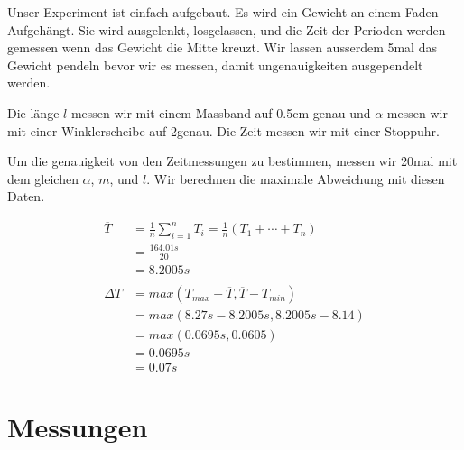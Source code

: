 \documentclass[12pt, a4paper, twoside]{article}
\begin{document}
Unser Experiment ist einfach aufgebaut.
Es wird ein Gewicht an einem Faden Aufgehängt.
Sie wird ausgelenkt, losgelassen, und die Zeit der Perioden werden gemessen wenn das Gewicht die Mitte kreuzt.
Wir lassen ausserdem 5mal das Gewicht pendeln bevor wir es messen, damit ungenauigkeiten ausgependelt werden.

Die länge $l$ messen wir mit einem Massband auf 0.5cm genau und $\alpha$ messen wir mit einer Winklerscheibe auf 2\textdegree genau.
Die Zeit messen wir mit einer Stoppuhr.

Um die genauigkeit von den Zeitmessungen zu bestimmen, messen wir 20mal mit dem gleichen $\alpha$, $m$, und $l$.
Wir berechnen die maximale Abweichung mit diesen Daten.



\begin{align*}
  \overline{T} & = \frac{1}{n} \sum_{i=1}^{n} T_{i}=\frac{1}{n}\left(T_{1}+\cdots+T_{n}\right) \\
               & =\frac{164.01s}{20}                                                           \\
               & =8.2005s                                                                      \\
  \\
  \Delta T     & = max(T_{max} - \overline{T}, \overline{T} - T_{min})                         \\
               & = max(8.27s - 8.2005s, 8.2005s - 8.14)                                        \\
               & = max(0.0695s, 0.0605)                                                        \\
               & = 0.0695s                                                                     \\
               & = 0.07s
\end{align*}

\vfill\pagebreak

\section{Messungen}
\end{document}
